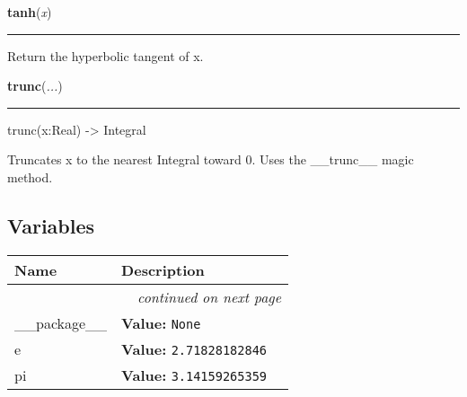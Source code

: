 \hspace{.8\funcindent}\begin{boxedminipage}{\funcwidth}

    \raggedright \textbf{tanh}(\textit{x})

    \vspace{-1.5ex}

    \rule{\textwidth}{0.5\fboxrule}
\setlength{\parskip}{2ex}
    Return the hyperbolic tangent of x.

\setlength{\parskip}{1ex}
    \end{boxedminipage}

    \label{math:trunc}

    \vspace{0.5ex}

\hspace{.8\funcindent}\begin{boxedminipage}{\funcwidth}

    \raggedright \textbf{trunc}(\textit{...})

    \vspace{-1.5ex}

    \rule{\textwidth}{0.5\fboxrule}
\setlength{\parskip}{2ex}
    trunc(x:Real) -{\textgreater} Integral

    Truncates x to the nearest Integral toward 0. Uses the \_\_trunc\_\_ 
    magic method.

\setlength{\parskip}{1ex}
    \end{boxedminipage}



  \subsection{Variables}

    \vspace{-1cm}
\hspace{\varindent}\begin{longtable}{|p{\varnamewidth}|p{\vardescrwidth}|l}
\cline{1-2}
\cline{1-2} \centering \textbf{Name} & \centering \textbf{Description}& \\
\cline{1-2}
\endhead\cline{1-2}\multicolumn{3}{r}{\small\textit{continued on next page}}\\\endfoot\cline{1-2}
\endlastfoot\raggedright \_\-\_\-p\-a\-c\-k\-a\-g\-e\-\_\-\_\- & \raggedright \textbf{Value:} 
{\tt None}&\\
\cline{1-2}
\raggedright e\- & \raggedright \textbf{Value:} 
{\tt 2.71828182846}&\\
\cline{1-2}
\raggedright p\-i\- & \raggedright \textbf{Value:} 
{\tt 3.14159265359}&\\
\cline{1-2}
\end{longtable}

